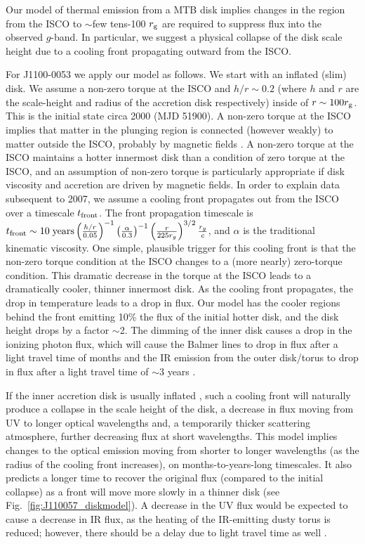 \documentclass{nature}
\begin{document}
Our model of thermal emission from a MTB disk implies changes in the
region from the ISCO to $\sim$few tens-100 $r_{\rm g}$ are required to
suppress flux into the observed $g$-band. In particular, we suggest a
physical collapse of the disk scale height due to a cooling front
propagating outward from the ISCO.

For J1100-0053 we apply our model as follows. We start with an
inflated (slim) disk. We assume a non-zero torque at the ISCO and
$h/r\sim0.2$ (where $h$ and $r$ are the scale-height and radius of the
accretion disk respectively) inside of $r\sim100 r_{\rm g}$.  This is
the initial state circa 2000 (MJD 51900). A non-zero torque at the
ISCO implies that matter in the plunging region is connected (however
weakly) to matter outside the ISCO, probably by magnetic fields
\cite[e.g., ][]{Gammie1999, Agol_Krolik2000}. A non-zero torque at the
ISCO maintains a hotter innermost disk than a condition of zero torque
at the ISCO, and an assumption of non-zero torque is particularly
appropriate if disk viscosity and accretion are driven by magnetic
fields. In order to explain data subsequent to 2007, we assume a
cooling front propagates out from the ISCO over a timescale $t_{\rm
front}$. The front propagation timescale is $ t_{\rm front} \sim 10 \;
{\rm years} \left(\frac{h/r}{0.05}\right)^{-1}
\left(\frac{\alpha}{0.3}\right)^{-1}
\left(\frac{r}{225r_{g}}\right)^{3/2} \frac{r_{g}}{c}$, and $\alpha$
is the traditional kinematic viscosity. One simple, plausible trigger
for this cooling front is that the non-zero torque condition at the
ISCO changes to a (more nearly) zero-torque condition. This dramatic
decrease in the torque at the ISCO leads to a dramatically cooler,
thinner innermost disk. As the cooling front propagates, the drop in
temperature leads to a drop in flux. Our model has the cooler regions
behind the front emitting 10\% the flux of the initial hotter disk,
and the disk height drops by a factor $\sim$2. The dimming of the
inner disk causes a drop in the ionizing photon flux, which will cause
the Balmer lines to drop in flux after a light travel time of months
and the IR emission from the outer disk/torus to drop in flux after a
light travel time of $\sim$3 years \citep{Sirko_Goodman2003, Jun2015}.

If the inner accretion disk is usually inflated \cite[see e.g.,
][]{Sirko_Goodman2003, Thompson2005, Hopkins_Quataert2011}, such a
cooling front will naturally produce a collapse in the scale height of
the disk, a decrease in flux moving from UV to longer optical
wavelengths and, a temporarily thicker scattering atmosphere, further
decreasing flux at short wavelengths.  This model implies changes to
the optical emission moving from shorter to longer wavelengths (as the
radius of the cooling front increases), on months-to-years-long
timescales. It also predicts a longer time to recover the original
flux (compared to the initial collapse) as a front will move more
slowly in a thinner disk (see Fig.~\ref{fig:J110057_diskmodel}). A
decrease in the UV flux would be expected to cause a decrease in IR
flux, as the heating of the IR-emitting dusty torus is reduced;
however, there should be a delay due to light travel time as well
\cite[e.g., ][]{Jun2015}.
\end{document}

